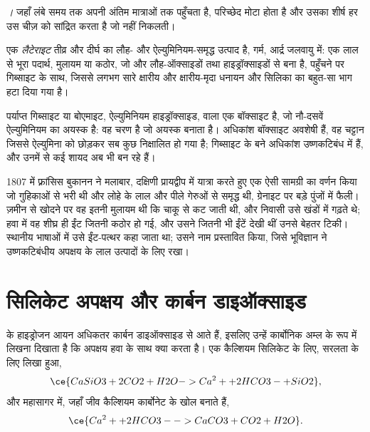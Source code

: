 \emph{।} जहाँ  लंबे समय तक अपनी अंतिम मात्राओं तक पहुँचता है, परिच्छेद मोटा होता है और उसका शीर्ष हर उस चीज़ को सांद्रित करता है जो नहीं निकलती।

\begin{definition}[लैटेराइट]
\label{def:b1:weathering-clays:laterite}
एक \emph{लैटेराइट} तीव्र और दीर्घ  का लौह- और ऐल्युमिनियम-समृद्ध उत्पाद है, गर्म, आर्द्र जलवायु में: एक लाल से भूरा पदार्थ, मुलायम या कठोर, जो  और लौह-ऑक्साइडों तथा हाइड्रॉक्साइडों से बना है,  पहुँचने पर गिब्साइट के साथ, जिससे लगभग सारे क्षारीय और क्षारीय-मृदा धनायन और सिलिका का बहुत-सा भाग हटा दिया गया है।
\end{definition}

पर्याप्त गिब्साइट या बोएमाइट, ऐल्युमिनियम हाइड्रॉक्साइड, वाला  एक बॉक्साइट है, जो नौ-दसवें ऐल्युमिनियम का अयस्क है:  वह चरण है जो अयस्क बनाता है। अधिकांश बॉक्साइट अवशेषी हैं, वह चट्टान जिससे ऐल्युमिना को छोड़कर सब कुछ निक्षालित हो गया है; गिब्साइट के बने अधिकांश उष्णकटिबंध में हैं, और उनमें से कई शायद अब भी बन रहे हैं।

\begin{history}[क्षेत्र से एक शब्द]
1807 में फ़्रांसिस बुकानन ने मलाबार, दक्षिणी प्रायद्वीप में यात्रा करते हुए एक ऐसी सामग्री का वर्णन किया जो गुहिकाओं से भरी थी और लोहे के लाल और पीले गेरुओं से समृद्ध थी, ग्रेनाइट पर बड़े पुंजों में फैली। ज़मीन से खोदने पर वह इतनी मुलायम थी कि चाकू से कट जाती थी, और निवासी उसे खंडों में गढ़ते थे; हवा में वह शीघ्र ही ईंट जितनी कठोर हो गई, और उसने जितनी भी ईंटें देखी थीं उनसे बेहतर टिकी। स्थानीय भाषाओं में उसे ईंट-पत्थर कहा जाता था; उसने  नाम प्रस्तावित किया, जिसे भूविज्ञान ने उष्णकटिबंधीय अपक्षय के लाल उत्पादों के लिए रखा।
\end{history}

\section{सिलिकेट अपक्षय और कार्बन डाइऑक्साइड}\label{sec:b1:weathering-clays:co2}

 के हाइड्रोजन आयन अधिकतर कार्बन डाइऑक्साइड से आते हैं, इसलिए उन्हें कार्बोनिक अम्ल के रूप में लिखना दिखाता है कि अपक्षय हवा के साथ क्या करता है। एक कैल्शियम सिलिकेट के लिए, सरलता के लिए  लिखा हुआ,
\[
  \ce{CaSiO3 + 2 CO2 + H2O -> Ca^2+ + 2 HCO3- + SiO2},
\]
और महासागर में, जहाँ जीव कैल्शियम कार्बोनेट के खोल बनाते हैं,
\[
  \ce{Ca^2+ + 2 HCO3- -> CaCO3 + CO2 + H2O}.
\]

